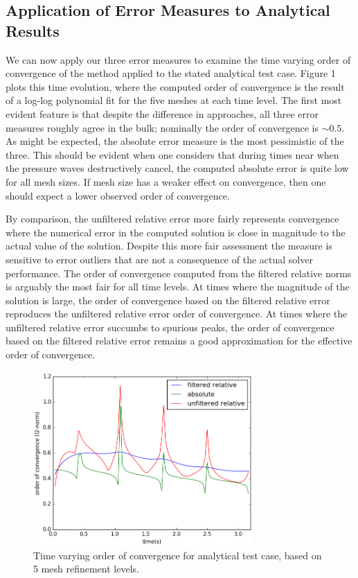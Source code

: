 \documentclass[letterpaper,10pt]{article}
\begin{document}
\subsection*{Application of Error Measures to Analytical Results}
We can now apply our three error measures to examine the time varying order of convergence of the method applied to the stated analytical test case. Figure 1 plots this time evolution, where the computed order of convergence is the result of a log-log polynomial fit for the five meshes at each time level. The first most evident feature is that despite the difference in approaches, all three error measures roughly agree in the bulk; nominally the order of convergence is $\sim 0.5$. As might be expected, the absolute error measure is the most pessimistic of the three. This should be evident when one considers that during times near when the pressure waves destructively cancel, the computed absolute error is quite low for all mesh sizes. If mesh size has a weaker effect on convergence, then one should expect a lower observed order of convergence.

By comparison, the unfiltered relative error more fairly represents convergence where the numerical error in the computed solution is close in magnitude to the actual value of the solution. Despite this more fair assessment the measure is sensitive to error outliers that are not a consequence of the actual solver performance. The order of convergence computed from the filtered relative norms is arguably the most fair for all time levels. At times where the magnitude of the solution is large, the order of convergence based on the filtered relative error reproduces the unfiltered relative error order of convergence. At times where the unfiltered relative error succumbs to spurious peaks, the order of convergence based on the filtered relative error remains a good approximation for the effective order of convergence.

\begin{figure}[!htb]
\centering
\includegraphics[width=0.75\textwidth]{timeconv.PNG}
\caption{\label{fig:unrolled}Time varying order of convergence for analytical test case, based on 5 mesh refinement levels.}
\end{figure}
\end{document}

